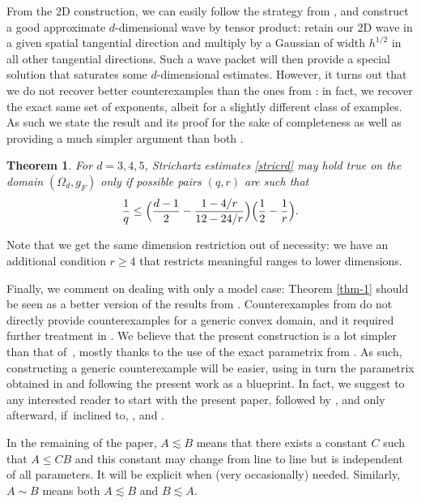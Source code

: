 \documentclass[JEP,XML,SOM,Unicode,NoEqCountersInSection,NoFloatCountersInSection,published]{cedram}
\theoremstyle{plain}
\newtheorem{thm}{Theorem}
\theoremstyle{definition}
\begin{document}
From the 2D construction, we can easily follow the strategy from \cite{doi2}, and construct a good approximate $d$-dimensional wave by tensor product: retain our 2D wave in a given spatial tangential direction and multiply by a Gaussian of width $h^{1/2}$ in all other tangential directions. Such a wave packet will then provide a special solution that saturates some $d$-dimensional estimates. However, it turns out that we do not recover better counterexamples than the ones from \cite{doi2}: in fact, we recover the exact same set of exponents, albeit for a slightly different class of examples. As such we state the result and its proof for the sake of completeness as well as providing a much simpler argument than both \cite{doi,doi2}.
\begin{thm}
\label{thm-2}
For $d=3,4,5$, Strichartz estimates \eqref{stricrd} may hold true on the domain $(\Omega_{d},g_{F})$ only if possible pairs $(q,r)$ are
such that
\begin{equation*}\label{adm-1/10d}
\frac 1q\leq \Bigl(\frac{d-1} 2 -\frac {1-4/r}{12-24/r}\Bigr)\Bigl(\frac{1}{2}-\frac{1}{r}\Bigr).
\end{equation*}
\end{thm}
Note that we get the same dimension restriction out of necessity: we have an additional condition $r\geq 4$ that restricts meaningful ranges to lower dimensions.

Finally, we comment on dealing with only a model case: Theorem \ref{thm-1} should be seen as a better version of the results from \cite{doi}. Counterexamples from \cite{doi} do not directly provide counterexamples for a generic convex domain, and it required further treatment in \cite{doi2}. We believe that the present construction is a lot simpler than that of~\cite{doi}, mostly thanks to the use of the exact parametrix from \cite{ILP3}. As such, constructing a generic counterexample will be easier, using in turn the parametrix obtained in \cite{ILLP} and following the present work as a blueprint. In fact, we suggest to any interested reader to start with the present paper, followed by \cite{ILP3}, \cite{ILLP} and only afterward, if~inclined to, \cite{doi}, \cite{doi2} and \cite{Annals}.

In the remaining of the paper, $A\lesssim B$ means that there exists a constant $C$ such that $A\leq CB$ and this constant may change from line to line but is independent of all parameters. It will be explicit when (very occasionally) needed. Similarly, $A\sim B$ means both $A\lesssim B$ and $B\lesssim A$.
\end{document}
